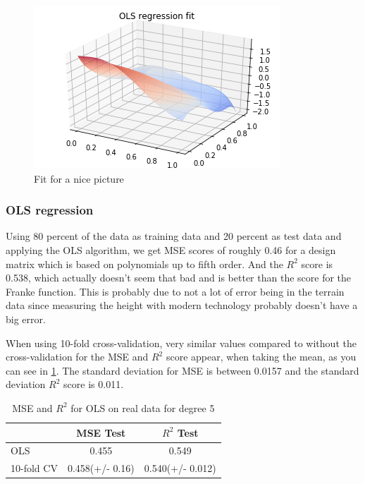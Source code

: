 \documentclass[12pt]{extarticle}
\begin{document}
\begin{figure}
    \centering
    \includegraphics{t4}
    \caption{Fit for a nice picture}
    \label{fig:t2}
\end{figure}

\subsubsection{OLS regression}

Using 80 percent of the data as training data and 20 percent as test data and applying the OLS algorithm, we get MSE scores of roughly 0.46 for a design matrix which is based on polynomials up to fifth order. And the $R^2$ score is 0.538, which actually doesn't seem that bad and is better than the score for the Franke function. This is probably due to not a lot of error being in the terrain data since measuring the height with modern technology probably doesn't have a big error.

When using 10-fold cross-validation, very similar values compared to without the cross-validation for the MSE and $R^2$ score appear, when taking the mean, as you can see in \ref{tab:t1}. The standard deviation for MSE is between 0.0157 and the standard deviation $R^2$ score is 0.011.

\begin{table}
  \begin{center}
    \caption{MSE and $R^2$ for OLS on real data for degree 5}
    \label{tab:t1}
    \begin{tabular}{l|c|c} 
      & \textbf{MSE Test} & \textbf{$R^2$ Test}\\
      \hline
      OLS & 0.455 & 0.549\\
      10-fold CV & 0.458(+/- 0.16) & 0.540(+/- 0.012)\\
    \end{tabular}
  \end{center}
\end{table}
\end{document}
